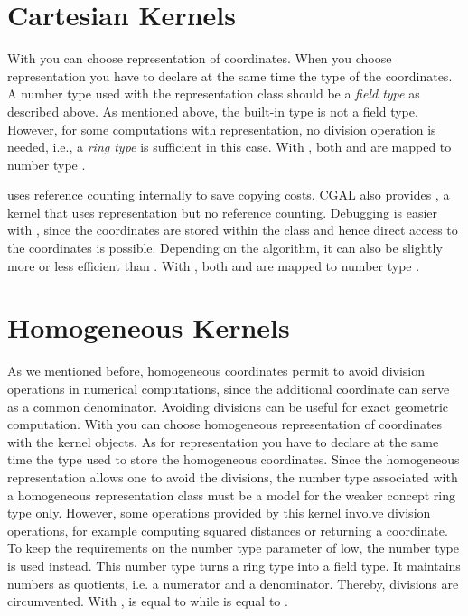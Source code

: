 \section{Cartesian Kernels}
With  you can choose  representation 
of coordinates. When you choose  representation you 
have to declare at the same time the type of the coordinates.
A number type used with the  representation class
should be a {\em field type} as described above.
As mentioned above, the built-in type  is not a field type.
However, for some computations with   representation, no 
division operation is needed, i.e., 
a {\em ring type} is sufficient in this case.
With , both 
and  are mapped to number type .

 uses reference counting internally to save copying
costs. CGAL also provides , a kernel
that uses  representation but no reference counting. 
Debugging is easier with , since the coordinates
are stored within the class and hence direct access to the coordinates is
possible.  Depending on the algorithm, it can also be slightly more or less
efficient than .
With , both 
and  are mapped to number type .

\section{Homogeneous Kernels}
As we mentioned before, homogeneous coordinates permit to avoid 
division operations in numerical computations, since the additional 
coordinate can serve as a common denominator. 
Avoiding divisions can be useful for exact geometric computation. 
With  you can choose homogeneous representation 
of coordinates with the kernel objects. As for  representation you 
have to declare at the same time the type used to store the homogeneous
coordinates. Since the homogeneous representation allows one to avoid the
divisions, the number type associated with a homogeneous representation class
must be a model for the weaker concept ring type only. However,
some operations provided by this kernel involve division operations, for
example computing squared distances or returning a  coordinate.
To keep the requirements on the number type parameter of 
low, the number type  is used instead.
This number type turns a ring type into a field type. It maintains
numbers as quotients, i.e. a numerator and a denominator. 
Thereby, divisions are circumvented.
With ,  is
equal to  while 
 is equal to .

